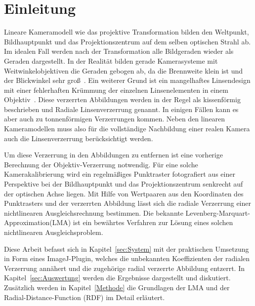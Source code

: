 \section{Einleitung}\label{sec:Introduction}
Lineare Kameramodell wie das projektive Transformation bilden den Weltpunkt, Bildhauptpunkt und das Projektionszentrum auf dem selben optischen Strahl ab. Im idealen Fall werden nach der Transformation alle Bildgeraden wieder als Geraden dargestellt. In der Realität bilden gerade Kamerasysteme mit Weitwinkelobjektiven die Geraden gebogen ab, da die Brennweite klein ist und der Blickwinkel sehr groß~\cite{HartleyRadDist}. Ein weiterer Grund ist ein mangelhaftes Linsendesign mit einer fehlerhaften Krümmung der einzelnen Linsenelementen in einem Objektiv~\cite{WengRadDist}\cite{Zhang:1996:EGT:844381.845228}. Diese verzerrten Abbildungen werden in der Regel als kissenförmig beschrieben und Radiale Linsenverzerrung genannt. In einigen Fällen kann es aber auch zu tonnenförmigen Verzerrungen kommen. Neben den linearen Kameramodellen muss also für die vollständige Nachbildung einer realen Kamera auch die Linsenverzerrung berücksichtigt werden. 

Um diese Verzerrung in den Abbildungen zu entfernen ist eine vorherige Berechnung der Objektiv-Verzerrung notwendig. Für eine solche Kamerakalibrierung wird ein regelmäßiges Punktraster fotografiert aus einer Perspektive bei der Bildhauptpunkt und das Projektionszentrum senkrecht auf der optischen Achse liegen. 
Mit Hilfe von Wertpaaren aus den Koordinaten des Punktrasters und der verzerrten Abbildung lässt sich die radiale Verzerrung einer nichtlinearen Ausgleichsrechnung bestimmen. Die bekannte Levenberg-Marquart-Approximation(LMA) ist ein bewährtes Verfahren zur Lösung eines solchen nichtlinearen Ausgleichsproblem.

Diese Arbeit befasst sich in Kapitel~\ref{sec:System} mit der praktischen Umsetzung in Form eines ImageJ-Plugin, welches die unbekannten Koeffizienten der radialen Verzerrung annähert und die zugehörige radial verzerrte Abbildung entzerrt. In Kapitel~\ref{sec:Auswertung} werden die Ergebnisse dargestellt und diskutiert. Zusätzlich werden in Kapitel~\ref{Methode} die Grundlagen der LMA und der Radial-Distance-Function (RDF) im Detail erläutert.
























